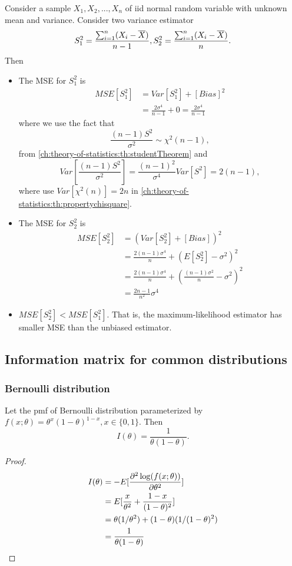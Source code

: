 \begin{refsection}
\begin{example}
	Consider a sample $X_1,X_2,...,X_n$ of iid normal random variable with unknown mean and variance. 
	Consider two variance estimator $$S_1^2 = \frac{\sum_{i=1}^{n} (X_i - \overline{X})}{n-1}, S_2^2 = \frac{\sum_{i=1}^{n} (X_i - \overline{X})}{n}.$$
	Then
	\begin{itemize}
		\item The MSE for $S_1^2$ is
		\begin{align*}
		MSE[S_1^2] &= Var[S_1^2] + [Bias]^2 \\
		&= \frac{2\sigma^4}{n-1} + 0 = \frac{2\sigma^4}{n-1}
		\end{align*}
		where we use the fact that 
		$$\frac{(n-1)S^2}{\sigma^2}\sim \chi^2({n-1}),$$
		from \autoref{ch:theory-of-statistics:th:studentTheorem} and
		$$Var[\frac{(n-1)S^2}{\sigma^2}] = \frac{(n-1)^2}{\sigma^4}Var[S^2] = 2(n-1),$$
		where use $Var[\chi^2(n)] = 2n$ in \autoref{ch:theory-of-statistics:th:propertychisquare}.
		\item The MSE for $S_2^2$ is
		\begin{align*}
		MSE[S_2^2] &= (Var[S_2^2] + [Bias])^2 \\
		&= \frac{2(n-1)\sigma^4}{n} + (E[S_2^2] - \sigma^2)^2 \\
		&= \frac{2(n-1)\sigma^4}{n} + (\frac{(n-1)\sigma^2}{n} - \sigma^2)^2 \\
		&= \frac{2n-1}{n^2}\sigma^4
		\end{align*}
		\item $MSE[S_2^2] < MSE[S_1^2]$. That is, the maximum-likelihood estimator has smaller MSE than the unbiased estimator.
		
	\end{itemize}
	
\end{example}

\subsection{Information matrix for common distributions}

\subsubsection{Bernoulli distribution}
\begin{lemma}
	Let the pmf of Bernoulli distribution parameterized by $f(x;\theta) = \theta^x(1-\theta)^{1-x},x\in\{0,1\}$. Then
	$$I(\theta) =  \frac{1}{\theta(1-\theta)}.$$
\end{lemma}
\begin{proof}
	\begin{align*}
I(\theta) &= -E[\frac{\partial^2 \log(f(x;\theta))}{\partial \theta^2}] \\
&= E[\frac{x}{\theta^2} + \frac{1-x}{(1-\theta)^2}]\\
&= \theta (1/\theta^2) + (1-\theta)(1/(1-\theta)^2) \\
&= \frac{1}{\theta(1-\theta)}
\end{align*}
\end{proof}


\end{refsection}
